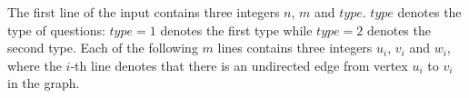 The first line of the input contains three integers $n$, $m$ and $type$.
$type$ denotes the type of questions: $type = 1$ denotes the first type while $type = 2$ denotes the second type.
Each of the following $m$ lines contains three integers $u_i$, $v_i$ and $w_i$, where the $i$-th line denotes that there is an undirected edge from vertex $u_i$ to $v_i$ in the graph.